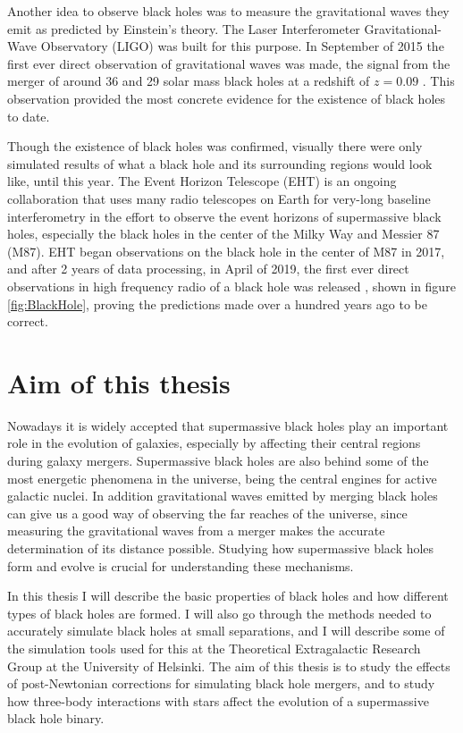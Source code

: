 \documentclass[english, oneside]{HYgradu}
\begin{document}
Another idea to observe black holes was to measure the gravitational waves they emit as predicted by Einstein's theory. The Laser Interferometer Gravitational-Wave Observatory (LIGO) was built for this purpose. In September of 2015 the first ever direct observation of gravitational waves was made, the signal from the merger of around 36 and 29 solar mass black holes at a redshift of $z = 0.09$ \citep{abbott:2016}. This observation provided the most concrete evidence for the existence of black holes to date.

Though the existence of black holes was confirmed, visually there were only simulated results of what a black hole and its surrounding regions would look like, until this year. The Event Horizon Telescope (EHT) is an ongoing collaboration that uses many radio telescopes on Earth for very-long baseline interferometry in the effort to observe the event horizons of supermassive black holes, especially the black holes in the center of the Milky Way and Messier 87 (M87). EHT began observations on the black hole in the center of M87 in 2017, and after 2 years of data processing, in April of 2019, the first ever direct observations in high frequency radio of a black hole was released \citep{akiyama:2019}, shown in figure \ref{fig:BlackHole}, proving the predictions made over a hundred years ago to be correct.

\section{Aim of this thesis}

Nowadays it is widely accepted that supermassive black holes play an important role in the evolution of galaxies, especially by affecting their central regions during galaxy mergers. Supermassive black holes are also behind some of the most energetic phenomena in the universe, being the central engines for active galactic nuclei. In addition gravitational waves emitted by merging black holes can give us a good way of observing the far reaches of the universe, since measuring the gravitational waves from a merger makes the accurate determination of its distance possible. Studying how supermassive black holes form and evolve is crucial for understanding these mechanisms.

In this thesis I will describe the basic properties of black holes and how different types of black holes are formed. I will also go through the methods needed to accurately simulate black holes at small separations, and I will describe some of the simulation tools used for this at the Theoretical Extragalactic Research Group at the University of Helsinki. The aim of this thesis is to study the effects of post-Newtonian corrections for simulating black hole mergers, and to study how three-body interactions with stars affect the evolution of a supermassive black hole binary. 
\end{document}
